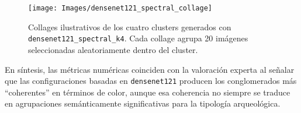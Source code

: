 \begin{figure}[!h]
  \centering
  \texttt{[image: Images/densenet121\_spectral\_collage]}
  \caption{Collages ilustrativos de los cuatro clusters generados con \texttt{densenet121\_spectral\_k4}.
  Cada collage agrupa 20 imágenes seleccionadas aleatoriamente dentro del cluster.}
  \label{fig:cluster_collages}
\end{figure}

En síntesis, las métricas numéricas coinciden con la valoración experta al señalar que las configuraciones basadas en \texttt{densenet121} producen los conglomerados más “coherentes” en términos de color, aunque esa coherencia no siempre se traduce en agrupaciones semánticamente significativas para la tipología arqueológica.
